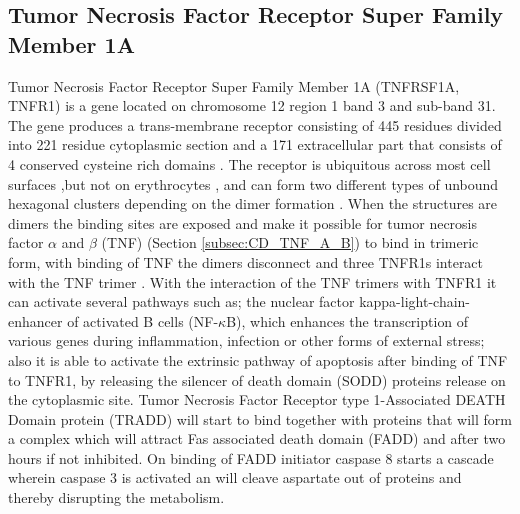 \subsection{Tumor Necrosis Factor Receptor Super Family Member 1A}
Tumor Necrosis Factor Receptor Super Family Member 1A (TNFRSF1A, TNFR1) is a gene located on chromosome 12 region 1 band 3 and sub-band 31. The gene produces a trans-membrane receptor consisting of 445 residues divided into 221 residue cytoplasmic section and a 171 extracellular part that consists of 4 conserved cysteine rich domains \cite{}.
The receptor is ubiquitous across most cell surfaces ,but not on erythrocytes \cite{}, and can form two different types of unbound hexagonal clusters depending on the dimer formation \cite{}. 
When the structures are dimers the binding sites are exposed and make it possible for tumor necrosis factor $\alpha$ and $\beta$ (TNF) (Section \ref{subsec:CD_TNF_A_B}) to bind in trimeric form, with binding of TNF the dimers disconnect and three TNFR1s interact with the TNF trimer \cite{}.
With the interaction of the TNF trimers with TNFR1 it can activate several pathways such as; the nuclear factor kappa-light-chain-enhancer of activated B cells (NF-$\kappa$B), which enhances the transcription of various genes during inflammation, infection or other forms of external stress; also it is able to activate the extrinsic pathway of apoptosis after binding of TNF to TNFR1, by releasing the silencer of death domain (SODD) proteins release on the cytoplasmic site. Tumor Necrosis Factor Receptor type 1-Associated DEATH Domain protein (TRADD) \cite{}
 will start to bind together with proteins that will form a complex which will attract Fas associated death domain (FADD) and after two hours\cite{} if not inhibited. 
On binding of FADD initiator caspase 8  starts a cascade wherein caspase 3 is activated an will cleave aspartate out of proteins and thereby disrupting the metabolism\cite{}.
\label{subsec:CD_TNFRSF1A}


